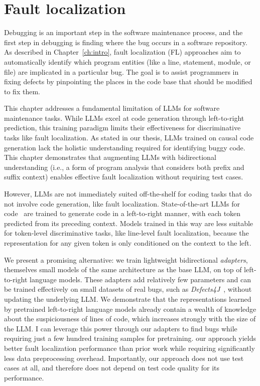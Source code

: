 \documentclass[12pt,openany,oneside,table]{cmuthesis}
\begin{document}
\chapter{Fault localization}
\label{ch:llmao}


Debugging is an important step in the software maintenance process, and the first step in debugging is finding where the bug occurs in a software repository.
As described in Chapter~\ref{ch:intro}, fault localization (FL) approaches aim to automatically identify which program entities (like a line, statement, module, or file) are implicated in a particular bug. The goal is to assist programmers in fixing defects by pinpointing the places in the code base that should be modified to fix them. 

This chapter addresses a fundamental limitation of LLMs for software maintenance tasks. While LLMs excel at code generation through left-to-right prediction, this training paradigm limits their effectiveness for discriminative tasks like fault localization. As stated in our thesis, LLMs trained on causal code generation lack the holistic understanding required for identifying buggy code. This chapter demonstrates that augmenting LLMs with bidirectional understanding (i.e., a form of program analysis that considers both prefix and suffix context) enables effective fault localization without requiring test cases.

However, LLMs are not immediately suited off-the-shelf for coding tasks that do not involve code generation, like fault localization. State-of-the-art LLMs for code~\cite{chen2021evaluating, black2021gpt, tunstall2022natural, nijkamp2022codegen} are trained to generate code in a left-to-right manner, with each token predicted from its preceding context. 
Models trained in this way are less suitable for token-level discriminative tasks, like line-level fault localization, because the representation for any given token is only conditioned on the context to the left. 

We present a promising alternative: we train lightweight bidirectional \emph{adapters}, themselves small models of the same architecture as the base LLM, on top of left-to-right language models. These adapters add relatively few parameters and can be trained effectively on small datasets of real bugs, such as \textit{Defects4J}~\cite{just2014defects4j}, without updating the underlying LLM. We demonstrate that the representations learned by pretrained left-to-right language models already contain a wealth of knowledge about the suspiciousness of lines of code, which increases strongly with the size of the LLM.  I can leverage this power through our adapters to find bugs while requiring just a few hundred training samples for pretraining. 
our approach yields better fault localization performance than prior work while requiring significantly less data preprocessing overhead. Importantly, our approach does not use test cases at all, and therefore does not depend on test code quality for its performance. 
\end{document}
